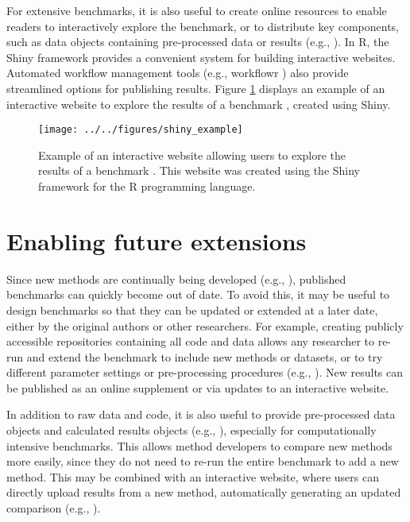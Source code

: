 \documentclass[12pt, a4paper]{article}
\begin{document}
For extensive benchmarks, it is also useful to create online resources to enable readers to interactively explore the benchmark, or to distribute key components, such as data objects containing pre-processed data or results (e.g., \citep{Soneson2018, Soneson2016, Wiwie2015, Bokulich2016, Conchuir2015}). In R, the Shiny framework provides a convenient system for building interactive websites. Automated workflow management tools (e.g., workflowr \citep{Blischak2018}) also provide streamlined options for publishing results. Figure \ref{fig:shiny} displays an example of an interactive website to explore the results of a benchmark \citep{Saelens2018b}, created using Shiny.





\vskip 5mm

\begin{figure}[H]
\begin{center}
\texttt{[image: ../../figures/shiny\_example]}
\end{center}
\caption{Example of an interactive website allowing users to explore the results of a benchmark \citep{Saelens2018b}. This website was created using the Shiny framework for the R programming language.}
\label{fig:shiny}
\end{figure}




\section*{Enabling future extensions}

Since new methods are continually being developed (e.g., \citep{Zappia2018}), published benchmarks can quickly become out of date. To avoid this, it may be useful to design benchmarks so that they can be updated or extended at a later date, either by the original authors or other researchers. For example, creating publicly accessible repositories containing all code and data allows any researcher to re-run and extend the benchmark to include new methods or datasets, or to try different parameter settings or pre-processing procedures (e.g., \citep{Saelens2018a, Saelens2018b, Duo2018, Soneson2018, Weber2016}). New results can be published as an online supplement or via updates to an interactive website.

In addition to raw data and code, it is also useful to provide pre-processed data objects and calculated results objects (e.g., \citep{Duo2018}), especially for computationally intensive benchmarks. This allows method developers to compare new methods more easily, since they do not need to re-run the entire benchmark to add a new method. This may be combined with an interactive website, where users can directly upload results from a new method, automatically generating an updated comparison (e.g., \citep{Kanitz2015}).
\end{document}
